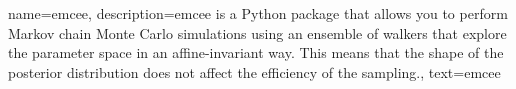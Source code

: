 {%
  name={emcee},%
  description={emcee is a Python package that allows you to perform Markov chain Monte Carlo simulations using an ensemble of walkers that explore the parameter space in an affine-invariant way. This means that the shape of the posterior distribution does not affect the efficiency of the sampling.},%
  text={emcee}%
}



